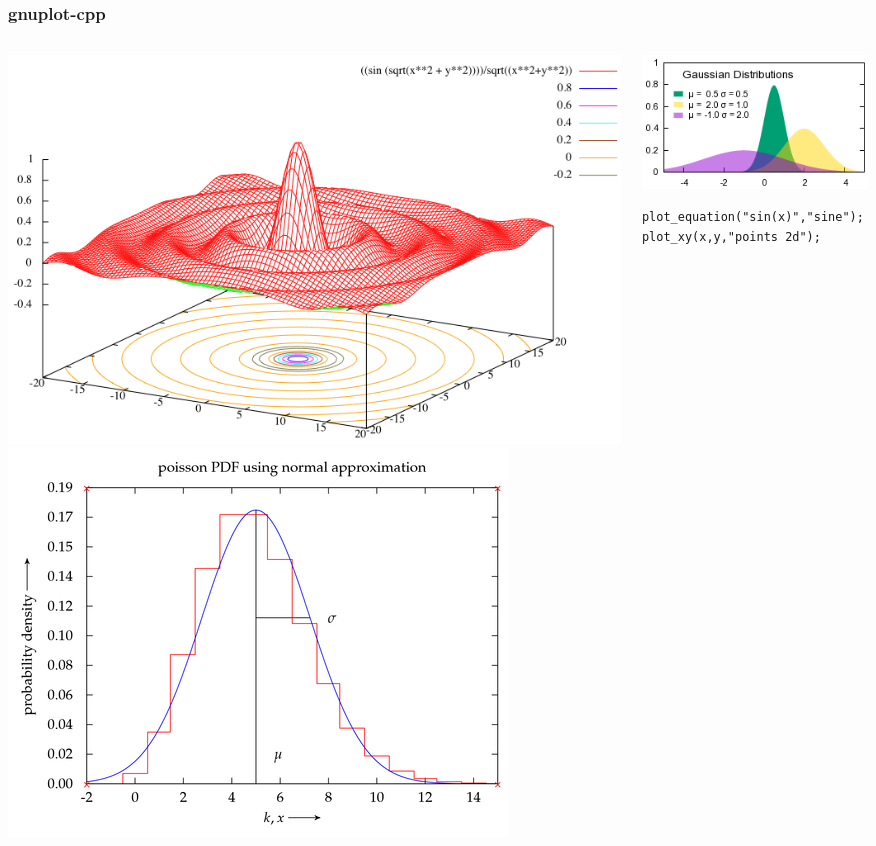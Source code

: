 \documentclass{beamer}
\begin{document}
\begin{frame}[fragile]
\frametitle{gnuplot-cpp}
\begin{columns}
\begin{column}{0.3\textwidth}
\includegraphics[scale=0.15]{gnuplot_demo_1}\\
\includegraphics[scale=0.2]{gnuplot_demo_2}
\end{column}
\begin{column}{0.7\textwidth}
\includegraphics[scale=0.5]{gnuplot_demo_3}
\begin{lstlisting}
plot_equation("sin(x)","sine");
plot_xy(x,y,"points 2d");
\end{lstlisting}
\end{column}
\end{columns}
\end{frame}
\end{document}
